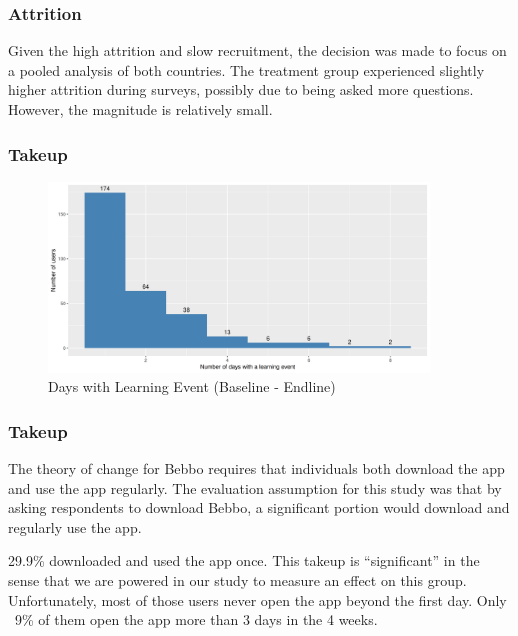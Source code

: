 \documentclass[aspectratio=169]{beamer}
\begin{document}
\begin{frame}[shrink=10]
 \frametitle{Attrition}



Given the high attrition and slow recruitment, the decision was made to focus on a pooled analysis of both countries. The treatment group experienced slightly higher attrition during surveys, possibly due to being asked more questions. However, the magnitude is relatively small.
\end{frame}

\begin{frame}
  \frametitle{Takeup}


\begin{figure}[H]
  \centering
\includegraphics[width=0.9\textwidth]{../plots/Treatment Takeup Baseline - Endline.png}
\caption{Days with Learning Event (Baseline - Endline)}
\label{fig:treatment-takeup-histogram}
\end{figure}

\end{frame}

\begin{frame}[shrink=25]
  \frametitle{Takeup}



The theory of change for Bebbo requires that individuals both download the app and use the app regularly. The evaluation assumption for this study was that by asking respondents to download Bebbo, a significant portion would download and regularly use the app. 

29.9\% downloaded and used the app once. This takeup is ``significant'' in the sense that we are powered in our study to measure an effect on this group. Unfortunately, most of those users never open the app beyond the first day. Only ~9\% of them open the app more than 3 days in the 4 weeks. 

\end{frame}
\end{document}
